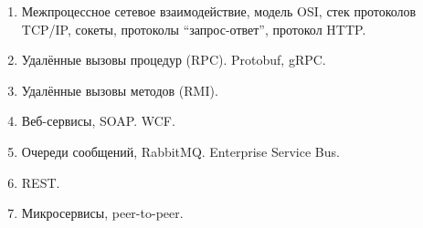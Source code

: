 \documentclass[a5paper]{article}
\begin{document}
\begin{enumerate}
	\item Межпроцессное сетевое взаимодействие, модель OSI, стек протоколов TCP/IP, сокеты, протоколы ``запрос-ответ'', протокол HTTP.
	\item Удалённые вызовы процедур (RPC). Protobuf, gRPC.
	\item Удалённые вызовы методов (RMI).
	\item Веб-сервисы, SOAP. WCF.
	\item Очереди сообщений, RabbitMQ. Enterprise Service Bus.
	\item REST.
	\item Микросервисы, peer-to-peer.
\end{enumerate}
\end{document}
